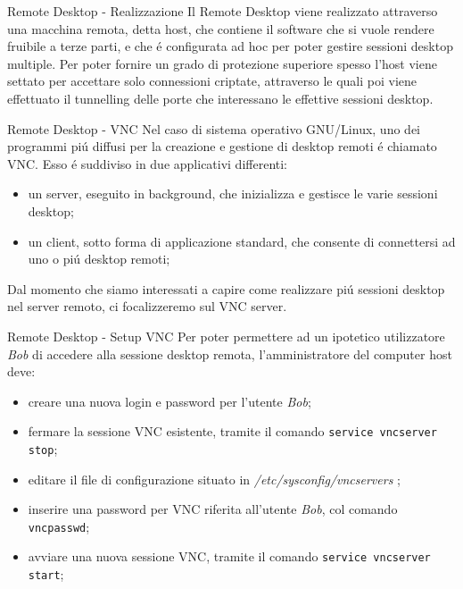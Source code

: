 \documentclass{beamer}
\begin{document}
\begin{frame}{Remote Desktop - Realizzazione}
Il Remote Desktop viene realizzato attraverso una macchina remota, detta host, che contiene il software che si vuole rendere
fruibile a terze parti, e che \'e configurata ad hoc per poter gestire sessioni desktop multiple. Per poter fornire un grado di 
protezione superiore spesso l'host viene settato per accettare solo connessioni criptate, attraverso le quali poi viene effettuato
il tunnelling delle porte che interessano le effettive sessioni desktop.
\end{frame}


\begin{frame}{Remote Desktop - VNC}
Nel caso di sistema operativo GNU/Linux, uno dei programmi pi\'u diffusi per la creazione e gestione di desktop remoti \'e
chiamato VNC. Esso \'e suddiviso in due applicativi differenti:
\begin{itemize}
\item un server, eseguito in background, che inizializza e gestisce le varie sessioni desktop;
\item un client, sotto forma di applicazione standard, che consente di connettersi ad uno o pi\'u desktop remoti;
\end{itemize}
Dal momento che siamo interessati a capire come realizzare pi\'u sessioni desktop nel server remoto, ci focalizzeremo sul VNC
server.
\end{frame}


\begin{frame}{Remote Desktop - Setup VNC}
Per poter permettere ad un ipotetico utilizzatore \emph{Bob} di accedere alla sessione desktop remota, l'amministratore del
computer host deve:
\begin{itemize}
\item creare una nuova login e password per l'utente \emph{Bob};
\item fermare la sessione VNC esistente, tramite il comando \texttt{service vncserver stop};
\item editare il file di configurazione situato in \emph{/etc/sysconfig/vncservers} ;
\item inserire una password per VNC riferita all'utente \emph{Bob}, col comando \texttt{vncpasswd};
\item avviare una nuova sessione VNC, tramite il comando \texttt{service vncserver start};
\end{itemize}
\end{frame}
\end{document}
